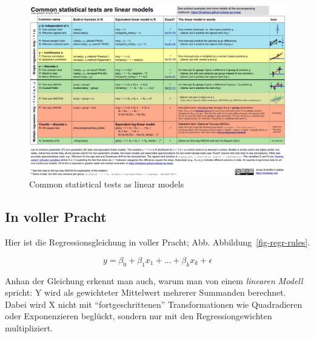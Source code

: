 \documentclass[
  a4paper,
  DIV=11]{scrreprt}
\theoremstyle{definition}
\theoremstyle{remark}
\begin{document}
\begin{figure}

{\centering \includegraphics{./img/linear_tests_cheat_sheet.png}

}

\caption{\label{fig-lindeloev}Common statistical tests as linear models}

\end{figure}

\hypertarget{in-voller-pracht}{%
\subsection{In voller Pracht}\label{in-voller-pracht}}

Hier ist die Regressionsgleichung in voller Pracht; Abb.
Abbildung~\ref{fig-regr-rules}.

\[y = \beta_0 + \beta_1 x_1 + \ldots + \beta_k x_k + \epsilon\]

Anhan der Gleichung erkennt man auch, warum man von einem \emph{linearen
Modell} spricht: Y wird als gewichteter Mittelwert mehrerer Summanden
berechnet. Dabei wird X nicht mit ``fortgeschrittenen'' Transformationen
wie Quadradieren oder Exponenzieren beglückt, sondern nur mit den
Regressiongewichten multipliziert.
\end{document}
